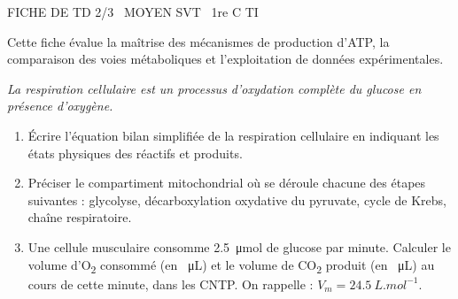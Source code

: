 \documentclass[11pt]{article}
\begin{document}
\begin{tcolorbox}[enhanced,colback=popink,colframe=popink,arc=10pt,boxrule=0pt,left=12pt,right=12pt,top=9pt,bottom=9pt]
{\color{white}\popxbold\small FICHE DE TD 2/3 \textbullet\ MOYEN \hfill SVT \textbullet\ 1re C TI\par}
\end{tcolorbox}
\vspace{4pt}
\noindent Cette fiche évalue la maîtrise des mécanismes de production d'ATP, la comparaison des voies métaboliques et l'exploitation de données expérimentales.

\begin{exercice}
    \textit{La respiration cellulaire est un processus d'oxydation complète du glucose en présence d'oxygène.}
    \begin{enumerate}
        \item Écrire l'équation bilan simplifiée de la respiration cellulaire en indiquant les états physiques des réactifs et produits.
        \item Préciser le compartiment mitochondrial où se déroule chacune des étapes suivantes : glycolyse, décarboxylation oxydative du pyruvate, cycle de Krebs, chaîne respiratoire.
        \item Une cellule musculaire consomme \SI{2,5}{\micro\mol} de glucose par minute. Calculer le volume d'O\textsubscript{2} consommé (en \SI{}{\micro L}) et le volume de CO\textsubscript{2} produit (en \SI{}{\micro L}) au cours de cette minute, dans les CNTP. On rappelle : $V_m = \SI{24,5}{L.mol^{-1}}$.
    \end{enumerate}
\end{exercice}
\end{document}
